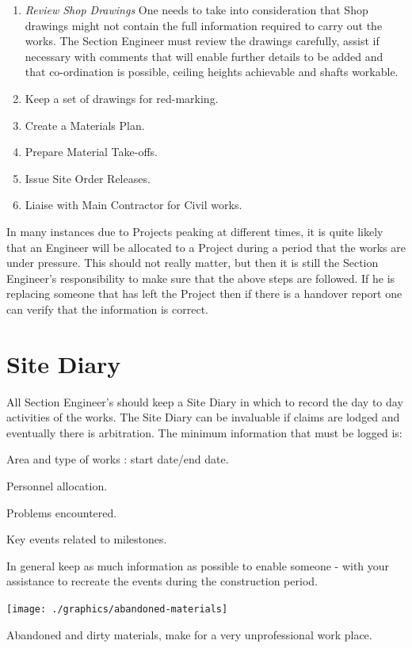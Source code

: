 \begin{enumerate}
\item \textit{Review Shop Drawings} One needs to take into consideration that
 Shop drawings might not contain the full information required to carry out the works. The Section Engineer must review the drawings carefully, assist if necessary
with comments that will enable further details to be added and that co-ordination
is possible, ceiling heights achievable and shafts workable.

\item Keep a set of drawings for red-marking.
\item Create a Materials Plan.
\item Prepare Material Take-offs.
\item Issue Site Order Releases.
\item Liaise with Main Contractor for Civil works.
\end{enumerate}


In many instances due to Projects peaking at different times, it is quite likely
that an Engineer will be allocated to a Project during a period that the works
are under pressure. This should not really matter, but then it is still the Section
Engineer's responsibility to make sure that the above steps are followed. If he
is replacing someone that has left the Project then if there is a handover report 
one can verify that the information is correct.

\section*{Site Diary}

All Section Engineer's should keep a Site Diary in which to record the day to
day activities of the works. The Site Diary can be invaluable if claims are
lodged and eventually there is arbitration. The minimum information that must
be logged is:

Area and type of works : start date/end date.

Personnel allocation.

Problems encountered.

Key events related to milestones.

In general keep as much information as possible to enable someone - with your
assistance to recreate the events during the construction period.
\begin{marginfigure}
\texttt{[image: ./graphics/abandoned-materials]}
\caption{Abandoned and dirty materials, make for a very unprofessional work place.}
\end{marginfigure}
